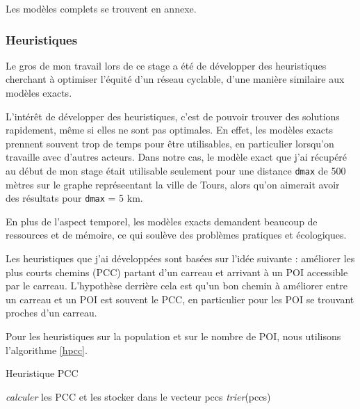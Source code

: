 Les modèles complets se trouvent en annexe.

\subsubsection{Heuristiques}\label{sect:heuristiquesopt}

Le gros de mon travail lors de ce stage a été de développer des heuristiques cherchant à optimiser l'équité d'un réseau cyclable, d'une manière similaire aux modèles exacts. 

L'intérêt de développer des heuristiques, c'est de pouvoir trouver des solutions rapidement, même si elles ne sont pas optimales. En effet, les modèles exacts prennent souvent trop de temps pour être utilisables, en particulier lorsqu'on travaille avec d'autres acteurs. Dans notre cas, le modèle exact que j'ai récupéré au début de mon stage était utilisable seulement pour une distance \verb|dmax| de 500 mètres sur le graphe représeentant la ville de Tours, alors qu'on aimerait avoir des résultats pour \verb|dmax| = 5 km.

En plus de l'aspect temporel, les modèles exacts demandent beaucoup de ressources et de mémoire, ce qui soulève des problèmes pratiques et écologiques. 

Les heuristiques que j'ai développées sont basées sur l'idée suivante : améliorer les plus courts chemins (PCC) partant d'un carreau et arrivant à un POI accessible par le carreau. L'hypothèse derrière cela est qu'un bon chemin à améliorer entre un carreau et un POI est souvent le PCC, en particulier pour les POI se trouvant proches d'un carreau.

Pour les heuristiques sur la population et sur le nombre de POI, nous utilisons l'algorithme \ref{hpcc}.  

\begin{algorithm}[!ht]
\DontPrintSemicolon
\caption{Heuristique PCC}
\label{hpcc}
\emph{calculer} les PCC et les stocker dans le vecteur pccs\;
\emph{trier}(pccs) 
\end{algorithm}

